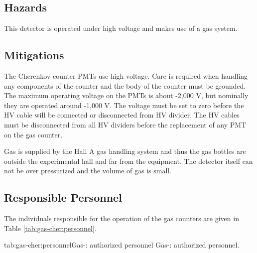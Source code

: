 \begin{safetyen}{0}{0}

\subsection{Hazards}

This detector is operated under high voltage and makes use of a gas system.

\subsection{Mitigations}

The Cherenkov counter PMTs use high voltage. Care is required when handling any 
components of the counter and the body of the \Cherenkov{} counter must be grounded. 
The maximum operating voltage on the PMTs is about -2,000 V, but
nominally they are operated around -1,000 V. The voltage must be set to
zero before the HV cable will be connected or disconnected from HV divider.
The HV cables must be disconnected from all HV dividers before the replacement
of any PMT on the gas \Cherenkov{} counter. 


Gas is supplied by the Hall A gas handling system and thus the gas bottles are outside
the experimental hall and far from the equipment.   The detector itself can not be over
pressurized and the volume of gas is small.

\subsection{Responsible Personnel} 

The individuals responsible for the operation 
of the gas \Cherenkov{} counters are given in Table \ref{tab:gas-cher:personnel}.

\begin{namestab}{tab:gas-cher:personnel}{Gas-\Cherenkov{}: authorized personnel}{%
      Gas-\Cherenkov{}: authorized personnel.}
  \JackSegal{}
\end{namestab}
\end{safetyen}







